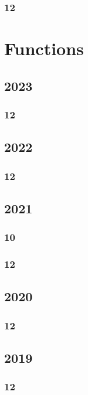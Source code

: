 \documentclass[11pt]{book}
\begin{document}
\subsection{12}



\chapter{Functions}
\section{2023}
\subsection{12}

\section{2022}
\subsection{12}

\section{2021}
\subsection{10}

\subsection{12}

\section{2020} 
\subsection{12} 

\section{2019} 
\subsection{12}





\end{document}
